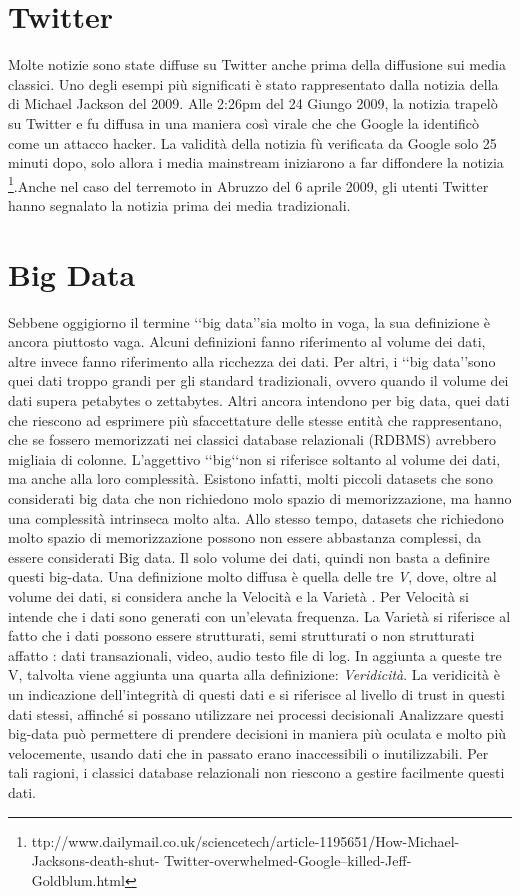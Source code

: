 \section{Twitter}
Molte notizie sono state diffuse su Twitter anche prima della diffusione sui media classici. Uno degli esempi più significati è stato rappresentato dalla notizia della di Michael Jackson del 2009. Alle 2:26pm
del 24 Giungo 2009, la notizia trapelò su Twitter e fu diffusa in una maniera così virale che che Google la identificò come un attacco hacker. La validità della notizia fù verificata da Google solo 25 minuti dopo,   solo allora i media mainstream iniziarono a far diffondere la notizia \footnote{ttp://www.dailymail.co.uk/sciencetech/article-1195651/How-Michael-Jacksons-death-shut-
Twitter-overwhelmed-Google–killed-Jeff-Goldblum.html}.Anche nel caso del terremoto in Abruzzo del 6 aprile 2009, gli utenti Twitter hanno segnalato la notizia prima dei media tradizionali. 
\section{Big Data}
Sebbene oggigiorno il termine \lq\lq big data\rq\rq sia molto in voga, la sua definizione è ancora piuttosto vaga. Alcuni definizioni fanno riferimento al volume dei dati, altre  invece fanno riferimento alla ricchezza dei dati. Per altri, i \lq\lq big data\rq\rq sono   quei dati troppo grandi per gli standard tradizionali, ovvero quando il volume dei dati supera petabytes o zettabytes. Altri ancora intendono per big data, quei dati che riescono ad esprimere più sfaccettature delle stesse entità che rappresentano, che se fossero memorizzati nei classici database relazionali (RDBMS) avrebbero migliaia di colonne. 
L'aggettivo \lq\lq big\lq\lq non si riferisce soltanto al volume dei dati, ma anche alla loro complessità. Esistono infatti, molti piccoli datasets che  sono considerati big data che non richiedono molo spazio di memorizzazione, ma hanno una complessità intrinseca molto alta. Allo stesso tempo, datasets che richiedono molto spazio di memorizzazione possono non essere abbastanza complessi, da essere considerati Big data. Il solo volume dei dati, quindi non basta a definire questi big-data. Una definizione molto diffusa è quella delle tre \emph{V}, dove, oltre al volume dei dati, si considera anche la Velocità e la Varietà .
Per Velocità si intende che i dati sono generati con un'elevata frequenza.
La Varietà si riferisce al fatto che i dati possono essere  strutturati, semi strutturati o non strutturati affatto : dati transazionali, video, audio testo file di log.
In aggiunta a queste tre V, talvolta viene aggiunta una quarta alla definizione: \emph{Veridicità}.
La veridicità è un indicazione dell'integrità di questi dati e si riferisce al livello di trust in questi dati stessi, affinché si possano utilizzare nei processi decisionali
Analizzare questi big-data può permettere  di prendere decisioni in maniera più oculata e molto più velocemente, usando dati che in passato erano inaccessibili o inutilizzabili.
Per tali ragioni, i classici database relazionali non riescono a gestire facilmente questi dati.

